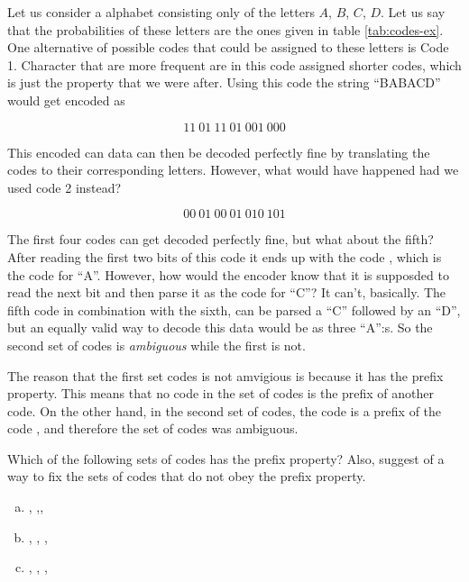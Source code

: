 Let us consider a alphabet consisting only of the letters $A$, $B$,
$C$, $D$. Let us say that the probabilities of these letters are the
ones given in table \ref{tab:codes-ex}. One alternative of possible
codes that could be assigned to these letters is Code 1. Character
that are more frequent are in this code assigned shorter codes, which
is just the property that we were after. Using this code the string
``BABACD'' would get encoded as

\begin{equation*}
  11\ 01\ 11\ 01\ 001\ 000
\end{equation*}

This encoded can data can then be decoded perfectly fine by
translating the codes to their corresponding letters. However, what
would have happened had we used code 2 instead?

\begin{equation*}
  00\ 01\ 00\ 01\ 010\ 101
\end{equation*}

The first four codes can get decoded perfectly fine, but what about
the fifth? After reading the first two bits of this code it ends up
with the code , which is the code for ``A''. However, how
would the encoder know that it is supposded to read the next bit and
then parse it as the code for ``C''? It can't, basically. The fifth
code in combination with the sixth,  can be parsed a ``C''
followed by an ``D'', but an equally valid way to decode this data
would be as three ``A'':s. So the second set of codes is
\textit{ambiguous} while the first is not.

The reason that the first set codes is not amvigious is because it has
the prefix property. This means that no code in the set of codes is
the prefix of another code. On the other hand, in the second set of
codes, the code  is a prefix of the code , and
therefore the set of codes was ambiguous.

\begin{Exercise}[label={prefix-prop}]

  Which of the following sets of codes has the prefix property?  Also,
  suggest of a way to fix the sets of codes that do not obey the
  prefix property.

  \begin{enumerate}[(a)]
  \item {}, ,,

  \item {}, , , 

  \item {}, , , 

  \end{enumerate}

\end{Exercise}

